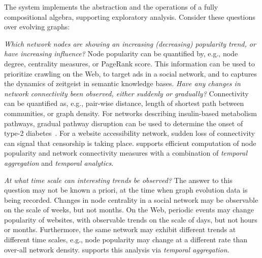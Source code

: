 %
The \ql system implements the \tg abstraction and the operations of a
fully compositional algebra, supporting exploratory analysis. 
Consider these questions over evolving graphs:

{\em Which network nodes are showing an increasing (decreasing) popularity trend,
  or have increasing influence?}
Node popularity can be quantified by, e.g., node degree, centrality measures,
or PageRank score.  This information can be used to prioritize
crawling on the Web, to target ads in a social network, and to
captures the dynamics of zeitgeist in semantic knowledge bases.
%
{\em Have any changes in network connectivity been observed, either
  suddenly or gradually?} Connectivity can be quantified as,
e.g., pair-wise distance, length of shortest path between communities,
or graph density.  For networks describing insulin-based metabolism
pathways, gradual pathway disruption can be used to determine the
onset of type-2 diabetes~\cite{DBLP:journals/tcsb/BeyerTLSF10}.  For a
website accessibility network, sudden loss of connectivity can signal
that censorship is taking place.
%
\ql supports efficient computation of node popularity and network
connectivity measures with a combination of {\em temporal aggregation}
and {\em temporal analytics}.

{\em At what time scale can interesting trends be observed?} The
answer to this question may not be known a priori, at the time when
graph evolution data is being recorded.  Changes in node centrality in
a social network may be observable on the scale of weeks, but not
months.  On the Web, periodic events may change popularity
of websites, with observable trends on the scale of days, but not
hours or months.  Furthermore, the same network may
exhibit different trends at different time scales, e.g., node
popularity may change at a different rate than over-all network
density.  \ql supports this analysis via {\em temporal aggregation}.


